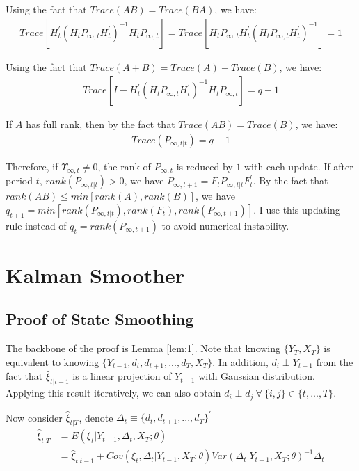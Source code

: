 \documentclass[12pt]{article}
\numberwithin{equation}{section}
\begin{document}
Using the fact that $Trace(AB)=Trace(BA)$, we have:
\begin{align*}
    Trace[H_t^{'}(H_tP_{\infty,t}H_t^{'})^{-1}H_tP_{\infty,t}] = Trace[H_tP_{\infty,t}H_t^{'}(H_tP_{\infty,t}H_t^{'})^{-1}] = 1
\end{align*}

Using the fact that $Trace(A+B) = Trace(A) + Trace(B)$, we have:
\begin{align*}
    Trace[I - H_t^{'}(H_tP_{\infty,t}H_t^{'})^{-1}H_tP_{\infty,t}]=q-1
\end{align*}

If $A$ has full rank, then by the fact that $Trace(AB)=Trace(B)$, we have:
\begin{align*}
    Trace(P_{\infty,t|t}) = q-1
\end{align*}

Therefore, if $\Upsilon_{\infty,t}\neq0$, the rank of $P_{\infty,t}$ is reduced by $1$ with each update. If after period $t$, $rank(P_{\infty,t|t})>0$, we have $P_{\infty,t+1} = F_tP_{\infty,t|t}F_t^{'}$. By the fact that $rank(AB)\leq min[rank(A), rank(B)]$, we have $q_{t+1}=min[rank(P_{\infty,t|t}),rank(F_t), rank(P_{\infty,t+1})]$. I use this updating rule instead of $q_{t} = rank(P_{\infty,t+1})$ to avoid numerical instability. 

\section{Kalman Smoother}
\subsection{Proof of State Smoothing} \label{ap:smooth}
The backbone of the proof is Lemma \ref{lem:1}. Note that knowing $\{Y_T, X_T\}$ is equivalent to knowing $\{Y_{t-1},d_t,d_{t+1},...,d_T, X_T\}$. In addition, $d_i \perp Y_{t-1}$ from the fact that $\hat{\xi}_{t|t-1}$ is a linear projection of $Y_{t-1}$ with Gaussian distribution. Applying this result iteratively, we can also obtain $d_i \perp d_j \:\forall\: \{i,j\} \in \{t,...,T\}$.

Now consider $\hat{\xi}_{t|T}$, denote $\Delta_t\equiv\{d_t,d_{t+1},...,d_T\}^{'}$ 
\begin{align*}
    \hat{\xi}_{t|T} &= E(\xi_t|Y_{t-1},\Delta_{t},X_T;\theta) \\
    &= \hat{\xi}_{t|t-1} + Cov(\xi_t,\Delta_t|Y_{t-1},X_T;\theta)Var(\Delta_t|Y_{t-1},X_T;\theta)^{-1}\Delta_t
\end{align*}
\end{document}
